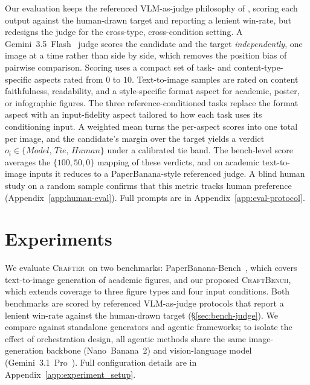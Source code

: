 \documentclass{article}
\newcommand{\Crafter}{\textsc{Crafter}\xspace}
\newcommand{\CrafterBench}{\textsc{CraftBench}\xspace}
\newcommand{\PaperBananaBench}{PaperBanana-Bench\xspace}
\begin{document}
Our evaluation keeps the referenced VLM-as-judge philosophy of \citet{zhu2026paperbanana}, scoring each output against the human-drawn target and reporting a lenient win-rate, but redesigns the judge for the cross-type, cross-condition setting. A Gemini~3.5~Flash~\citep{gemini35flash} judge scores the candidate and the target \emph{independently}, one image at a time rather than side by side, which removes the position bias of pairwise comparison. Scoring uses a compact set of task- and content-type-specific aspects rated from $0$ to $10$. Text-to-image samples are rated on content faithfulness, readability, and a style-specific format aspect for academic, poster, or infographic figures. The three reference-conditioned tasks replace the format aspect with an input-fidelity aspect tailored to how each task uses its conditioning input. A weighted mean turns the per-aspect scores into one total per image, and the candidate's margin over the target yields a verdict $o_i \in \{\textit{Model},\,\textit{Tie},\,\textit{Human}\}$ under a calibrated tie band. The bench-level score averages the $\{100, 50, 0\}$ mapping of these verdicts, and on academic text-to-image inputs it reduces to a PaperBanana-style referenced judge. A blind human study on a random sample confirms that this metric tracks human preference (Appendix~\ref{app:human-eval}). Full prompts are in Appendix~\ref{app:eval-protocol}.


\section{Experiments}
\label{sec:experiments}

We evaluate \Crafter\ on two benchmarks: \PaperBananaBench~\citep{zhu2026paperbanana}, which covers text-to-image generation of academic figures, and our proposed \CrafterBench, which extends coverage to three figure types and four input conditions. Both benchmarks are scored by referenced VLM-as-judge protocols that report a lenient win-rate against the human-drawn target (\S\ref{sec:bench-judge}). We compare against standalone generators and agentic frameworks; to isolate the effect of orchestration design, all agentic methods share the same image-generation backbone (Nano~Banana~2) and vision-language model (Gemini~3.1~Pro~\citep{gemini31pro}). Full configuration details are in Appendix~\ref{app:experiment_setup}.
\end{document}
